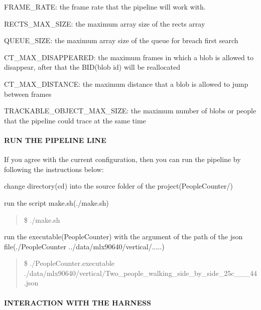 \begin{DoxyItemize}
\begin{DoxyItemize}
\item F\+R\+A\+M\+E\+\_\+\+R\+A\+TE\+: the frame rate that the pipeline will work with.
\item R\+E\+C\+T\+S\+\_\+\+M\+A\+X\+\_\+\+S\+I\+ZE\+: the maximum array size of the rects array
\item Q\+U\+E\+U\+E\+\_\+\+S\+I\+ZE\+: the maximum array size of the queue for breach first search
\item C\+T\+\_\+\+M\+A\+X\+\_\+\+D\+I\+S\+A\+P\+P\+E\+A\+R\+ED\+: the maximum frames in which a blob is allowed to disappear, after that the B\+I\+D(blob id) will be reallocated
\item C\+T\+\_\+\+M\+A\+X\+\_\+\+D\+I\+S\+T\+A\+N\+CE\+: the maximum distance that a blob is allowed to jump between frames
\item T\+R\+A\+C\+K\+A\+B\+L\+E\+\_\+\+O\+B\+J\+E\+C\+T\+\_\+\+M\+A\+X\+\_\+\+S\+I\+ZE\+: the maximum number of blobs or people that the pipeline could trace at the same time
\end{DoxyItemize}
\end{DoxyItemize}

\paragraph*{R\+UN T\+HE P\+I\+P\+E\+L\+I\+NE L\+I\+NE}

If you agree with the current configuration, then you can run the pipeline by following the instructions below\+:
\begin{DoxyEnumerate}
\item change directory(cd) into the source folder of the project(People\+Counter/)
\item run the script make.\+sh(./make.sh) \begin{quote}
\$ ./make.sh \end{quote}

\item run the executable(\+People\+Counter) with the argument of the path of the json file(./\+People\+Counter ../data/mlx90640/vertical/.....) \begin{quote}
\$ ./\+People\+Counter.executable ./data/mlx90640/vertical/\+Two\+\_\+people\+\_\+walking\+\_\+side\+\_\+by\+\_\+side\+\_\+25c\+\_\+\_\+\_\+44.json \end{quote}

\end{DoxyEnumerate}

\paragraph*{I\+N\+T\+E\+R\+A\+C\+T\+I\+ON W\+I\+TH T\+HE H\+A\+R\+N\+E\+SS}

